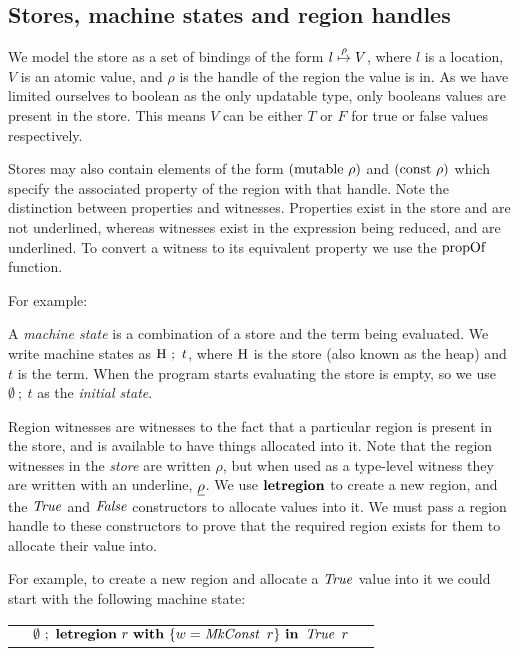 \subsection{Stores, machine states and region handles}
\label{Core:Language:region-handles}

We model the store as a set of bindings of the form $l \stackrel{\rho}{\mapsto} V$, where $l$ is a location, $V$ is an atomic value, and $\rho$ is the handle of the region the value is in. As we have limited ourselves to boolean as the only updatable type, only booleans values are present in the store. This means $V$ can be either $T$ or $F$ for true or false values respectively. 

Stores may also contain elements of the form $(\textrm{mutable} \ \rho)$ and $(\textrm{const} \ \rho)$ which specify the associated property of the region with that handle. Note the distinction between properties and witnesses. Properties exist in the store and are not underlined, whereas witnesses exist in the expression being reduced, and are underlined. To convert a witness to its equivalent property we use the $\textrm{propOf}$ function. 

For example:


A \emph{machine state} is a combination of a store and the term being evaluated. We write machine states as $\textrm{H} \ ; \ t$, where $\textrm{H}$ is the store (also known as the heap) and $t$ is the term. When the program starts evaluating the store is empty, so we use $\emptyset \ ; \ t$ as the \emph{initial state}.

Region witnesses are witnesses to the fact that a particular region is present in the store, and is available to have things allocated into it. Note that the region witnesses in the \emph{store} are written $\rho$, but when used as a type-level witness they are written with an underline, $\underline{\rho}$. We use $\textrm{\textbf{letregion}}$ to create a new region, and the $\operatorname{\mathit{True}}$ and $\operatorname{\mathit{False}}$ constructors to allocate values into it. We must pass a region handle to these constructors to prove that the required region exists for them to allocate their value into.

For example, to create a new region and allocate a $\operatorname{\mathit{True}}$ value into it we could start with the following machine state:

\medskip
\qq
\begin{tabular}{lll}
		& $\emptyset \ ; \ \kletregion \ r \ \kwith \ \{ w = \iMkConst \ r \} \ \kin \ \iTrue \ r$
\end{tabular}
\medskip

